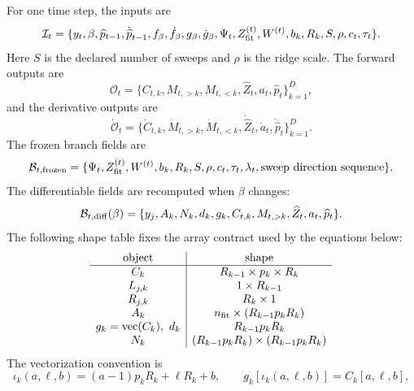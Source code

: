 \documentclass[11pt]{article}
\numberwithin{equation}{section}
\begin{document}
For one time step, the inputs are
\begin{equation}
    \mathcal I_t
    =
    \{y_t,\beta,\widehat p_{t-1},\dot{\widehat p}_{t-1},
      f_\beta,\dot f_\beta,g_\beta,\dot g_\beta,
      \Psi_t,Z_{\rm fit}^{(t)},W^{(t)},b_k,R_k,S,\rho,c_t,\tau_t\}.
    \label{eq:p25-ls-2}
\end{equation}
Here \(S\) is the declared number of sweeps and \(\rho\) is the ridge scale.
The forward outputs are
\begin{equation}
    \mathcal O_t
    =
    \{C_{t,k},M_{t,>k},M_{t,<k},\widehat Z_t,a_t,\widehat p_t\}_{k=1}^{D},
    \label{eq:p25-ls-3}
\end{equation}
and the derivative outputs are
\begin{equation}
    \dot{\mathcal O}_t
    =
    \{\dot C_{t,k},\dot M_{t,>k},\dot M_{t,<k},
      \dot{\widehat Z}_t,\dot a_t,\dot{\widehat p}_t\}_{k=1}^{D}.
    \label{eq:p25-ls-4}
\end{equation}
The frozen branch fields are
\begin{equation}
    \mathcal B_{t,\rm frozen}
    =
    \{\Psi_t,Z_{\rm fit}^{(t)},W^{(t)},b_k,R_k,S,\rho,c_t,\tau_t,
      \lambda_t,\text{sweep direction sequence}\}.
    \label{eq:p25-ls-5}
\end{equation}
The differentiable fields are recomputed when \(\beta\) changes:
\begin{equation}
    \mathcal B_{t,\rm diff}(\beta)
    =
    \{y_j,A_k,N_k,d_k,g_k,C_{t,k},M_{t,>k},\widehat Z_t,a_t,\widehat p_t\}.
    \label{eq:p25-ls-6}
\end{equation}
The following shape table fixes the array contract used by the equations
below:
\begin{equation}
\begin{array}{c|c}
\text{object} & \text{shape}\\
\hline
C_k & R_{k-1}\times p_k\times R_k\\
L_{j,k} & 1\times R_{k-1}\\
R_{j,k} & R_k\times 1\\
A_k & n_{\rm fit}\times (R_{k-1}p_kR_k)\\
g_k=\operatorname{vec}(C_k),\ d_k & R_{k-1}p_kR_k\\
N_k & (R_{k-1}p_kR_k)\times(R_{k-1}p_kR_k)
\end{array}
    \label{eq:p25-ls-shape-table}
\end{equation}
The vectorization convention is
\begin{equation}
    \iota_k(a,\ell,b)
    =
    (a-1)p_kR_k+\ell R_k+b,
    \qquad
    g_k[\iota_k(a,\ell,b)]=C_k[a,\ell,b],
    \label{eq:p25-ls-flattening}
\end{equation}
\end{document}
